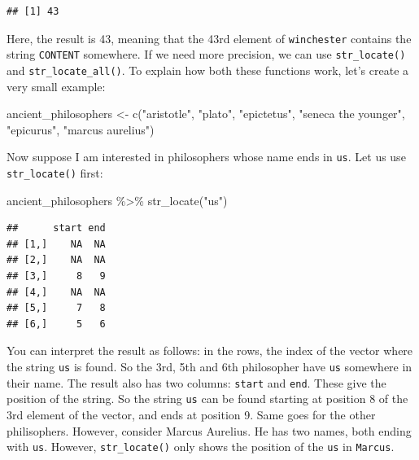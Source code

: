\documentclass[
]{article}
\newenvironment{Shaded}{\begin{snugshade}}{\end{snugshade}}
\newcommand{\FunctionTok}[1]{\textcolor[rgb]{0.00,0.00,0.00}{#1}}
\newcommand{\NormalTok}[1]{#1}
\newcommand{\OtherTok}[1]{\textcolor[rgb]{0.56,0.35,0.01}{#1}}
\newcommand{\SpecialCharTok}[1]{\textcolor[rgb]{0.00,0.00,0.00}{#1}}
\newcommand{\StringTok}[1]{\textcolor[rgb]{0.31,0.60,0.02}{#1}}
\begin{document}
\begin{verbatim}
## [1] 43
\end{verbatim}

Here, the result is 43, meaning that the 43rd element of \texttt{winchester} contains the string \texttt{CONTENT}
somewhere. If we need more precision, we can use \texttt{str\_locate()} and \texttt{str\_locate\_all()}. To explain
how both these functions work, let's create a very small example:

\begin{Shaded}
\begin{Highlighting}[]
\NormalTok{ancient\_philosophers }\OtherTok{\textless{}{-}} \FunctionTok{c}\NormalTok{(}\StringTok{"aristotle"}\NormalTok{, }\StringTok{"plato"}\NormalTok{, }\StringTok{"epictetus"}\NormalTok{, }\StringTok{"seneca the younger"}\NormalTok{, }\StringTok{"epicurus"}\NormalTok{, }\StringTok{"marcus aurelius"}\NormalTok{)}
\end{Highlighting}
\end{Shaded}

Now suppose I am interested in philosophers whose name ends in \texttt{us}. Let us use \texttt{str\_locate()} first:

\begin{Shaded}
\begin{Highlighting}[]
\NormalTok{ancient\_philosophers }\SpecialCharTok{\%\textgreater{}\%}
  \FunctionTok{str\_locate}\NormalTok{(}\StringTok{"us"}\NormalTok{)}
\end{Highlighting}
\end{Shaded}

\begin{verbatim}
##      start end
## [1,]    NA  NA
## [2,]    NA  NA
## [3,]     8   9
## [4,]    NA  NA
## [5,]     7   8
## [6,]     5   6
\end{verbatim}

You can interpret the result as follows: in the rows, the index of the vector where the
string \texttt{us} is found. So the 3rd, 5th and 6th philosopher have \texttt{us} somewhere in their name.
The result also has two columns: \texttt{start} and \texttt{end}. These give the position of the string. So the
string \texttt{us} can be found starting at position 8 of the 3rd element of the vector, and ends at position
9. Same goes for the other philisophers. However, consider Marcus Aurelius. He has two names, both
ending with \texttt{us}. However, \texttt{str\_locate()} only shows the position of the \texttt{us} in \texttt{Marcus}.
\end{document}
